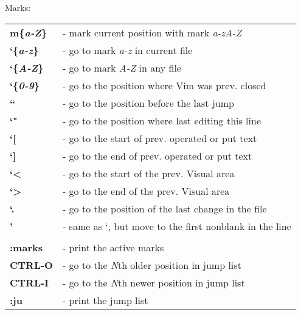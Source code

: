 \documentclass[a4paper,8pt]{extarticle}
\begin{document}
\begin{multicols*}{3}
        \noindent
        {\large Marks:}\\
        \begin{tabular}{ l l }
            \textbf{m\{\textsl{a-Z}\}}          &    - mark current position with mark \textsl{a-zA-Z}      \\
            \textbf{`\{\textsl{a-z}\}}          &    - go to mark \textsl{a-z} in current file              \\
            \textbf{`\{\textsl{A-Z}\}}          &    - go to mark \textsl{A-Z} in any file                  \\
            \textbf{`\{\textsl{0-9}\}}          &    - go to the position where Vim was prev. closed        \\
            \textbf{``}                         &    - go to the position before the last jump              \\
            \textbf{`"}                         &    - go to the position where last editing this line      \\
            \textbf{`[}                         &    - go to the start of prev. operated or put text        \\
            \textbf{`]}                         &    - go to the end of prev. operated or put text          \\
            \textbf{`<}                         &    - go to the start of the prev. Visual area             \\
            \textbf{`>}                         &    - go to the end of the prev. Visual area               \\
            \textbf{`.}                         &    - go to the position of the last change in the file    \\
            \textbf{'}                          &    - same as `, but move to the first nonblank in the line\\
                                                &                                                           \\
            \textbf{:marks}                     &    - print the active marks                               \\
            \textbf{CTRL-O}                     &    - go to the \textsl{N}th older position in jump list   \\
            \textbf{CTRL-I}                     &    - go to the \textsl{N}th newer position in jump list   \\
            \textbf{:ju}                        &    - print the jump list                                  \\
        \end{tabular}\\


\end{multicols*}
\end{document}
